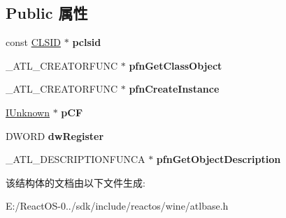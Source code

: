 \subsection*{Public 属性}
\begin{DoxyCompactItemize}
\item 
\mbox{\label{struct___a_t_l___o_b_j_m_a_p___e_n_t_r_y_a___v1___t_a_g_ab0851c3ab991e398de70085a3c098a72}} 
const \hyperlink{struct___i_i_d}{C\+L\+S\+ID} $\ast$ {\bfseries pclsid}
\item 
\mbox{\label{struct___a_t_l___o_b_j_m_a_p___e_n_t_r_y_a___v1___t_a_g_ab6a501fef0f010b3e7b9e74851cd4f10}} 
\+\_\+\+A\+T\+L\+\_\+\+C\+R\+E\+A\+T\+O\+R\+F\+U\+NC $\ast$ {\bfseries pfn\+Get\+Class\+Object}
\item 
\mbox{\label{struct___a_t_l___o_b_j_m_a_p___e_n_t_r_y_a___v1___t_a_g_a5bca1d880c50b68ec42eb1717377d5e5}} 
\+\_\+\+A\+T\+L\+\_\+\+C\+R\+E\+A\+T\+O\+R\+F\+U\+NC $\ast$ {\bfseries pfn\+Create\+Instance}
\item 
\mbox{\label{struct___a_t_l___o_b_j_m_a_p___e_n_t_r_y_a___v1___t_a_g_a86dd295601855d3383b5aac77c4753af}} 
\hyperlink{interface_i_unknown}{I\+Unknown} $\ast$ {\bfseries p\+CF}
\item 
\mbox{\label{struct___a_t_l___o_b_j_m_a_p___e_n_t_r_y_a___v1___t_a_g_aec86fab6be15bd17b80240bf0ab8c220}} 
D\+W\+O\+RD {\bfseries dw\+Register}
\item 
\mbox{\label{struct___a_t_l___o_b_j_m_a_p___e_n_t_r_y_a___v1___t_a_g_a1c8591965ca32eab8a968393c7631bb1}} 
\+\_\+\+A\+T\+L\+\_\+\+D\+E\+S\+C\+R\+I\+P\+T\+I\+O\+N\+F\+U\+N\+CA $\ast$ {\bfseries pfn\+Get\+Object\+Description}
\end{DoxyCompactItemize}


该结构体的文档由以下文件生成\+:\begin{DoxyCompactItemize}
\item 
E\+:/\+React\+O\+S-\/0../sdk/include/reactos/wine/atlbase.\+h\end{DoxyCompactItemize}
